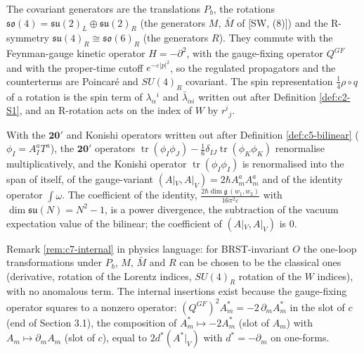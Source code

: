 \begin{remark}
The covariant generators are the translations $P_b$, the rotations $\mathfrak{so}(4)=\mathfrak{su}(2)_L\oplus\mathfrak{su}(2)_R$ (the generators $M$, $\bar M$ of [SW, (8)]) and the R-symmetry $\mathfrak{su}(4)_R\cong\mathfrak{so}(6)_R$ (the generators $R$). They commute with the Feynman-gauge kinetic operator $H=-\partial^2$, with the gauge-fixing operator $Q^{GF}$ and with the proper-time cutoff $e^{-\varepsilon|p|^2}$, so the regulated propagators and the counterterms are Poincaré and $SU(4)_R$ covariant. The spin representation $\tfrac14\rho\circ q$ of a rotation is the spin term of $\lambda_\alpha{}^i$ and $\bar\lambda_{\dot\alpha i}$ written out after Definition \ref{def:c2-S1}, and an R-rotation acts on the index of $W$ by $r^i{}_j$.
\end{remark}

\begin{remark}
With the $\mathbf{20'}$ and Konishi operators written out after Definition \ref{def:c5-bilinear} ($\phi_I=A^a_IT^a$), the $\mathbf{20'}$ operators $\operatorname{tr}(\phi_I\phi_J)-\tfrac16\delta_{IJ}\operatorname{tr}(\phi_K\phi_K)$ renormalise multiplicatively, and the Konishi operator $\operatorname{tr}(\phi_I\phi_I)$ is renormalised into the span of itself, of the gauge-variant $(A|_V,A|_V)=2\hbar A^a_mA^a_m$ and of the identity operator $\int\omega$. The coefficient of the identity, $\frac{2\hbar\dim\mathfrak g\,(w_1,w_2)}{16\pi^2\varepsilon}$ with $\dim\mathfrak{su}(N)=N^2-1$, is a power divergence, the subtraction of the vacuum expectation value of the bilinear; the coefficient of $(A|_V,A|_V)$ is $0$.
\end{remark}

\begin{remark}
Remark \ref{rem:c7-internal} in physics language: for BRST-invariant $O$ the one-loop transformations under $P_b$, $M$, $\bar M$ and $R$ can be chosen to be the classical ones (derivative, rotation of the Lorentz indices, $SU(4)_R$ rotation of the $W$ indices), with no anomalous term. The internal insertions exist because the gauge-fixing operator squares to a nonzero operator: $(Q^{GF})^2A^*_m=-2\,\partial_mA^*_m$ in the slot of $c$ (end of Section 3.1), the composition of $A^*_m\mapsto-2A^*_m$ (slot of $A_m$) with $A_m\mapsto\partial_mA_m$ (slot of $c$), equal to $2d^*(A^*|_V)$ with $d^*=-\partial_m$ on one-forms.
\end{remark}

